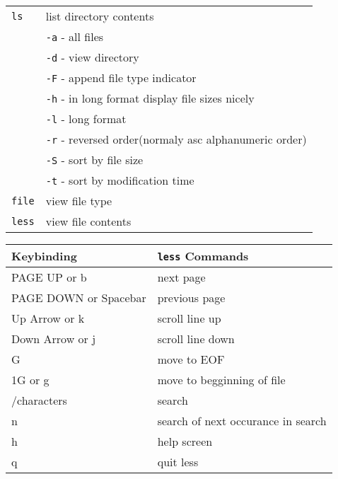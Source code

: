 \documentclass[8pt]{extarticle}
\begin{document}
\begin{multicols}{2}
\begin{tabular}{ll}
\texttt{ls} & list directory contents\\ 
& \texttt{-a} - all files\\
& \texttt{-d} - view directory\\
& \texttt{-F} - append file type indicator\\
& \texttt{-h} - in long format display file sizes nicely\\
& \texttt{-l} - long format\\
& \texttt{-r} - reversed order(normaly asc alphanumeric order)\\
& \texttt{-S} - sort by file size\\
& \texttt{-t} - sort by modification time\\		
\texttt{file} & view file type \\
\texttt{less} & view file contents
\end{tabular}

\begin{tabular}{ll}
Keybinding & \texttt{less} Commands \\ \hline
PAGE UP or b & next page \\
PAGE DOWN or Spacebar & previous page \\
Up Arrow or k & scroll line up \\
Down Arrow or j & scroll line down \\
G & move to EOF \\
1G or g & move to begginning of file \\
/characters & search \\
n & search of next occurance in search \\
h & help screen \\
q & quit less \\
\end{tabular}


\end{multicols}
\end{document}
